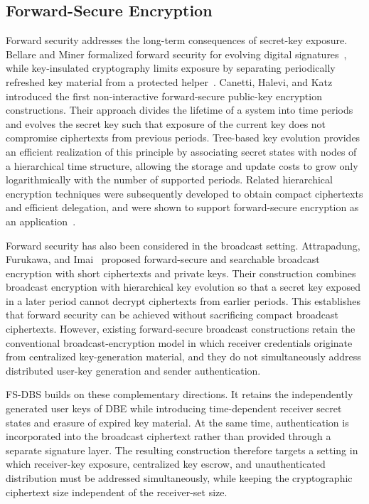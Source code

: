 \documentclass[sigconf,anonymous]{acmart}
\theoremstyle{definition}
\theoremstyle{definition}
\theoremstyle{definition}
\theoremstyle{definition}
\theoremstyle{definition}
\theoremstyle{definition}
\theoremstyle{definition}
\theoremstyle{definition}
\theoremstyle{definition}
\begin{document}
\subsection{Forward-Secure Encryption}

Forward security addresses the long-term consequences of secret-key exposure. Bellare and Miner formalized forward security for evolving digital signatures~\cite{bellare1999forward}, while key-insulated cryptography limits exposure by separating periodically refreshed key material from a protected helper~\cite{dodis2002keyinsulated}. Canetti, Halevi, and Katz~\cite{canetti2003forward} introduced the first non-interactive forward-secure public-key encryption constructions. Their approach divides the lifetime of a system into time periods and evolves the secret key such that exposure of the current key does not compromise ciphertexts from previous periods. Tree-based key evolution provides an efficient realization of this principle by associating secret states with nodes of a hierarchical time structure, allowing the storage and update costs to grow only logarithmically with the number of supported periods. Related hierarchical encryption techniques were subsequently developed to obtain compact ciphertexts and efficient delegation, and were shown to support forward-secure encryption as an application~\cite{yao2004complex,boneh2005hierarchical}.

Forward security has also been considered in the broadcast setting. Attrapadung, Furukawa, and Imai~\cite{attrapadung2006forward} proposed forward-secure and searchable broadcast encryption with short ciphertexts and private keys. Their construction combines broadcast encryption with hierarchical key evolution so that a secret key exposed in a later period cannot decrypt ciphertexts from earlier periods. This establishes that forward security can be achieved without sacrificing compact broadcast ciphertexts. However, existing forward-secure broadcast constructions retain the conventional broadcast-encryption model in which receiver credentials originate from centralized key-generation material, and they do not simultaneously address distributed user-key generation and sender authentication.

FS-DBS builds on these complementary directions. It retains the independently generated user keys of DBE while introducing time-dependent receiver secret states and erasure of expired key material. At the same time, authentication is incorporated into the broadcast ciphertext rather than provided through a separate signature layer. The resulting construction therefore targets a setting in which receiver-key exposure, centralized key escrow, and unauthenticated distribution must be addressed simultaneously, while keeping the cryptographic ciphertext size independent of the receiver-set size.
\end{document}
